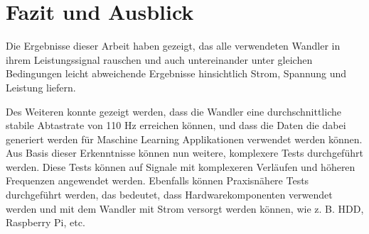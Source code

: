 \section{Fazit und Ausblick}

Die Ergebnisse dieser Arbeit haben gezeigt, das alle verwendeten Wandler in ihrem Leistungssignal rauschen und auch untereinander unter gleichen Bedingungen leicht abweichende Ergebnisse hinsichtlich Strom, Spannung und Leistung liefern.

Des Weiteren konnte gezeigt werden, dass die Wandler eine durchschnittliche stabile Abtastrate von 110 Hz erreichen können, und dass die Daten die dabei generiert werden für Maschine Learning Applikationen verwendet werden können. 
Aus Basis dieser Erkenntnisse können nun weitere, komplexere Tests durchgeführt werden. Diese Tests können auf Signale mit komplexeren Verläufen und höheren Frequenzen angewendet werden.  Ebenfalls können Praxisnähere Tests durchgeführt werden, das bedeutet, dass Hardwarekomponenten verwendet werden und mit dem Wandler mit Strom versorgt werden können, wie z. B. HDD, Raspberry Pi, etc.